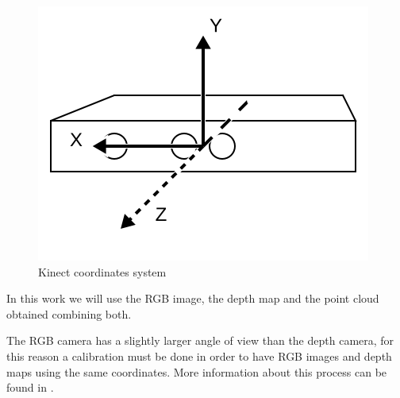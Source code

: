 \begin{figure}[H]
\begin{center}
\includegraphics[scale=0.55]{images/coordinates}
\caption{Kinect coordinates system}
\label{fig:coordinates}
\end{center}
\end{figure}

In this work we will use the RGB image, the depth map and the point cloud obtained combining both.
 
The RGB camera has a slightly larger angle of view than the depth camera, for this reason a calibration must be done 
in order to have RGB images and depth maps using the same coordinates. More information about 
this process can be found in \cite{sturm12iros}.
